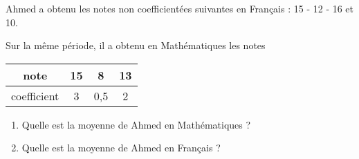 
Ahmed a obtenu les notes non coefficientées suivantes en Français : 15 - 12 - 16 et 10. 

Sur la même période, il  a obtenu en Mathématiques les notes 

\begin{tabular}{|c|c|c|c|}
\hline 
note & 15 & 8 & 13 \\ 
\hline 
coefficient & 3 & 0,5 & 2 \\ 
\hline 
\end{tabular} 


\begin{enumerate}
\item Quelle est la moyenne de Ahmed en Mathématiques ?
\item Quelle est la moyenne de Ahmed en Français ?
\end{enumerate}